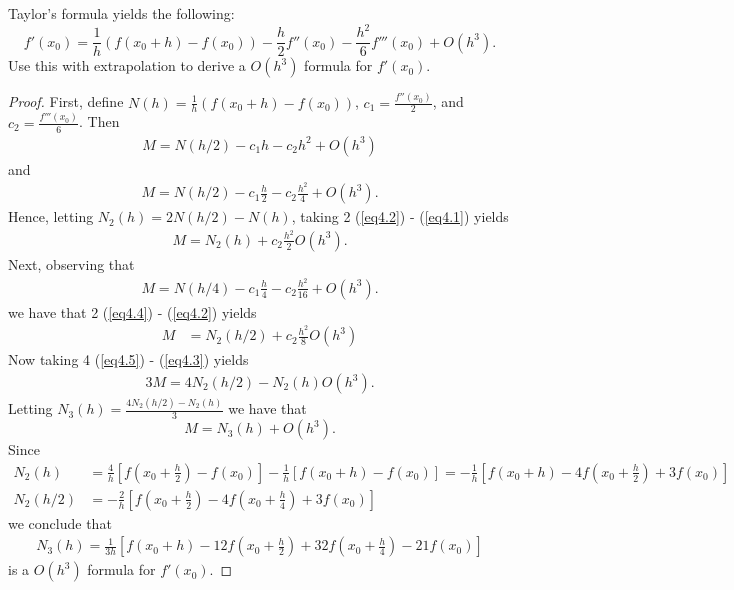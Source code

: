 \documentclass[8pt]{article}
\theoremstyle{definition}
\newenvironment{exercise}[1]
  {\renewcommand\theinnerexercise{#1}\innerexercise}
  {\endinnerexercise}
\begin{document}
\begin{exercise}{4}
Taylor's formula yields the following: $$f'(x_0) = \frac{1}{h} \left( f(x_0 + h) - f(x_0) \right) - \frac{h}{2} f''(x_0) - \frac{h^2}{6} f'''(x_0) + O(h^3).$$ Use this with extrapolation to derive a $O(h^3)$ formula for $f'(x_0)$.
\end{exercise}

\begin{proof}
First, define $N(h) = \frac{1}{h} \left( f(x_0 + h) - f(x_0) \right)$, $c_1 = \frac{f''(x_0)}{2}$, and $c_2 = \frac{f'''(x_0)}{6}$. Then
\begin{align}
M = N(h/2) - c_1 h - c_2 h^2 + O(h^3) \label{eq4.1}
\end{align}
and
\begin{align}
M = N(h/2) - c_1 \frac{h}{2} - c_2 \frac{h^2}{4} + O(h^3). \label{eq4.2}
\end{align}
Hence, letting $N_2 (h) = 2 N (h/2) - N(h)$, taking 2 (\ref{eq4.2}) - (\ref{eq4.1}) yields
\begin{align}
M = N_2 (h) + c_2 \frac{h^2}{2} O (h^3). \label{eq4.3}
\end{align}
Next, observing that
\begin{align}
M = N(h/4) - c_1 \frac{h}{4} - c_2 \frac{h^2}{16} + O(h^3). \label{eq4.4}
\end{align}
we have that 2 (\ref{eq4.4}) - (\ref{eq4.2}) yields
\begin{align}
M &= N_2 (h/2) + c_2 \frac{h^2}{8} O (h^3) \label{eq4.5}
\end{align}
Now taking 4 (\ref{eq4.5}) - (\ref{eq4.3}) yields
\begin{align}
3M = 4 N_2 (h/2) - N_2 (h) O (h^3). \nonumber
\end{align}
Letting $N_3 (h) = \frac{4 N_2 (h/2) - N_2 (h)}{3}$ we have that $$M = N_3 (h) + O (h^3).$$ Since 
\begin{align*}
N_2 (h) &= \frac{4}{h} \left[ f \left( x_0 + \frac{h}{2} \right) - f(x_0) \right] - \frac{1}{h} \left[ f (x_0 + h) - f(x_0) \right] = -\frac{1}{h} \left[ f(x_0 + h) - 4 f \left( x_0 + \frac{h}{2} \right) + 3 f(x_0) \right] \\
N_2 (h/2) &= -\frac{2}{h} \left[ f \left( x_0 + \frac{h}{2} \right) - 4 f \left( x_0 + \frac{h}{4} \right) + 3 f(x_0) \right]
\end{align*}
we conclude that 
\begin{align*}
N_3 (h) = \frac{1}{3h} \left[ f(x_0 + h) - 12 f \left( x_0 + \frac{h}{2} \right) + 32 f \left( x_0 + \frac{h}{4} \right) - 21 f(x_0) \right]
\end{align*}
is a $O(h^3)$ formula for $f'(x_0)$.
\end{proof}
\newpage
\end{document}
